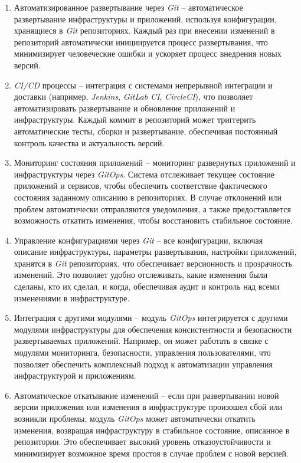 \begin{enumerate}
    \item Автоматизированное развертывание через \textit{Git} -- автоматическое развертывание инфраструктуры и приложений, используя конфигурации, хранящиеся в \textit{Git} репозиториях. Каждый раз при внесении изменений в репозиторий автоматически инициируется процесс развертывания, что минимизирует человеческие ошибки и ускоряет процесс внедрения новых версий.
    \item \textit{CI/CD} процессы -- интеграция с системами непрерывной интеграции и доставки (например, \textit{Jenkins}, \textit{GitLab CI}, \textit{CircleCI}), что позволяет автоматизировать развертывание и обновление приложений и инфраструктуры. Каждый коммит в репозиторий может триггерить автоматические тесты, сборки и развертывание, обеспечивая постоянный контроль качества и актуальность версий.
    \item Мониторинг состояния приложений -- мониторинг развернутых приложений и инфраструктуры через \textit{GitOps}. Система отслеживает текущее состояние приложений и сервисов, чтобы обеспечить соответствие фактического состояния заданному описанию в репозиториях. В случае отклонений или проблем автоматически отправляются уведомления, а также предоставляется возможность откатить изменения, чтобы восстановить стабильное состояние.
    \item Управление конфигурациями через \textit{Git} -- все конфигурации, включая описание инфраструктуры, параметры развертывания, настройки приложений, хранятся в \textit{Git} репозиториях, что обеспечивает версионность и прозрачность изменений. Это позволяет удобно отслеживать, какие изменения были сделаны, кто их сделал, и когда, обеспечивая аудит и контроль над всеми изменениями в инфраструктуре.
    \item Интеграция с другими модулями -- модуль \textit{GitOps} интегрируется с другими модулями инфраструктуры для обеспечения консистентности и безопасности развертываемых приложений. Например, он может работать в связке с модулями мониторинга, безопасности, управления пользователями, что позволяет обеспечить комплексный подход к автоматизации управления инфраструктурой и приложениям.
    \item Автоматическое откатывание изменений -- если при развертывании новой версии приложения или изменения в инфраструктуре произошел сбой или возникли проблемы, модуль \textit{GitOps} может автоматически откатить изменения, возвращая инфраструктуру в стабильное состояние, описанное в репозитории. Это обеспечивает высокий уровень отказоустойчивости и минимизирует возможное время простоя в случае проблем с новой версией.

\end{enumerate}
